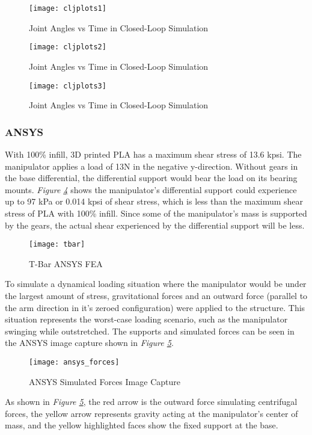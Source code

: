 \begin{figure}[htp]
  \center
  \texttt{[image: cljplots1]}
  \caption{Joint Angles vs Time in Closed-Loop Simulation}
  \label{fig:cljplots1}
\end{figure}
\begin{figure}[htp]
  \center
  \ContinuedFloat
  \captionsetup{list=off,format=cont}
  \texttt{[image: cljplots2]}
  \caption{Joint Angles vs Time in Closed-Loop Simulation}
  \label{fig:cljplots2}
\end{figure}
\begin{figure}[htp]
  \center
  \ContinuedFloat
  \captionsetup{list=off,format=cont}
  \texttt{[image: cljplots3]}
  \caption{Joint Angles vs Time in Closed-Loop Simulation}
  \label{fig:cljplots3}
\end{figure}
\subsubsection*{ANSYS}
With 100\% infill, 3D printed PLA has a maximum shear stress of 13.6 kpsi. The manipulator applies a load of 13N in the negative y-direction. Without gears in the base differential, the differential support would bear the load on its bearing mounts. \emph{Figure \ref{fig:tbar}} shows the manipulator’s differential support could experience up to 97 kPa or 0.014 kpsi of shear stress, which is less than the maximum shear stress of PLA with 100\% infill. Since some of the manipulator’s mass is supported by the gears, the actual shear experienced by the differential support will be less.

\begin{figure}[htp]
  \center
  \texttt{[image: tbar]}
  \caption{T-Bar ANSYS FEA}
  \label{fig:tbar}
\end{figure}

To simulate a dynamical loading situation where the manipulator would be under the largest amount of stress, gravitational forces and an outward force (parallel to the arm direction in it's zeroed configuration) were applied to the structure. This situation represents the worst-case loading scenario, such as the manipulator swinging while outstretched. The supports and simulated forces can be seen in the ANSYS image capture shown in \emph{Figure \ref{fig:ansys_forces}}.
\begin{figure}[htp]
  \center
  \texttt{[image: ansys\_forces]}
  \caption{ANSYS Simulated Forces Image Capture}
  \label{fig:ansys_forces}
\end{figure}
\newpage
As shown in \emph{Figure \ref{fig:ansys_forces}}, the red arrow is the outward force simulating centrifugal forces, the yellow arrow represents gravity acting at the manipulator's center of mass, and the yellow highlighted faces show the fixed support at the base.

